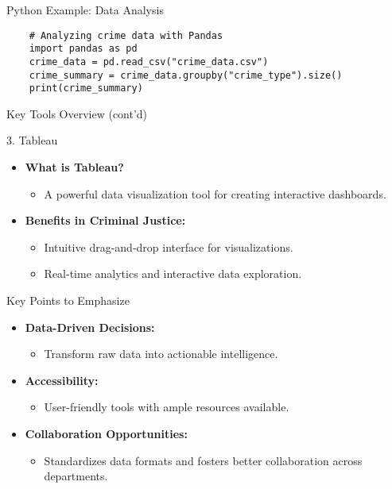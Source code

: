 \documentclass[aspectratio=169]{beamer}
\begin{document}
\begin{frame}[fragile]{Python Example: Data Analysis}
    \begin{lstlisting}
    # Analyzing crime data with Pandas
    import pandas as pd
    crime_data = pd.read_csv("crime_data.csv")
    crime_summary = crime_data.groupby("crime_type").size()
    print(crime_summary)
    \end{lstlisting}
\end{frame}

\begin{frame}{Key Tools Overview (cont'd)}
    \begin{block}{3. Tableau}
        \begin{itemize}
            \item \textbf{What is Tableau?} 
            \begin{itemize}
               \item A powerful data visualization tool for creating interactive dashboards.
            \end{itemize}
            \item \textbf{Benefits in Criminal Justice:} 
            \begin{itemize}
                \item Intuitive drag-and-drop interface for visualizations.
                \item Real-time analytics and interactive data exploration.
            \end{itemize}
        \end{itemize}
    \end{block}
\end{frame}

\begin{frame}{Key Points to Emphasize}
    \begin{itemize}
        \item \textbf{Data-Driven Decisions:} 
        \begin{itemize}
            \item Transform raw data into actionable intelligence.
        \end{itemize}
        \item \textbf{Accessibility:} 
        \begin{itemize}
            \item User-friendly tools with ample resources available.
        \end{itemize}
        \item \textbf{Collaboration Opportunities:} 
        \begin{itemize}
            \item Standardizes data formats and fosters better collaboration across departments.
        \end{itemize}
    \end{itemize}
\end{frame}
\end{document}
